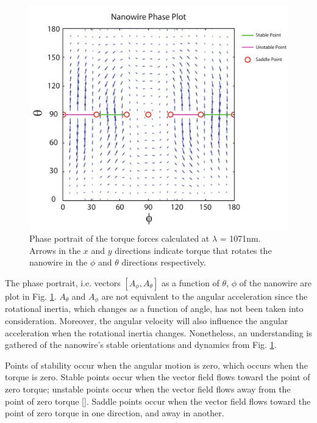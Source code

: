 \begin{figure}[!ht]
\centering\includegraphics[width = \textwidth]{Rotational_Torque_1071nm.pdf}
\caption{Phase portrait of the torque forces calculated at $\lambda$ = 1071nm. Arrows in the $x$ and $y$ directions indicate torque that rotates the nanowire in the $\phi$ and $\theta$ directions respectively.}\label{RotTorq1071}
\end{figure}
The phase portrait, i.e. vectors $[A_{\phi},A_{\theta}]$ as a function of $\theta$, $\phi$ of the nanowire are plot in Fig. \ref{RotTorq1071}.
$A_{\theta}$ and $A_{\phi}$ are not equivalent to the angular acceleration since the rotational inertia, which changes as a function of angle, has not been taken into consideration. Moreover, the angular velocity will also influence the angular acceleration when the rotational inertia changes. Nonetheless, an understanding is gathered of the nanowire's stable orientations and dynamics from Fig. \ref{RotTorq1071}.

Points of stability occur when the angular motion is zero, which occurs when the torque is zero. Stable points occur when the vector field flows toward the point of zero torque; unstable points occur when the vector field flows away from the point of zero torque [\cite{Strogatz}]. Saddle points occur when the vector field flows toward the point of zero torque in one direction, and away in another.


